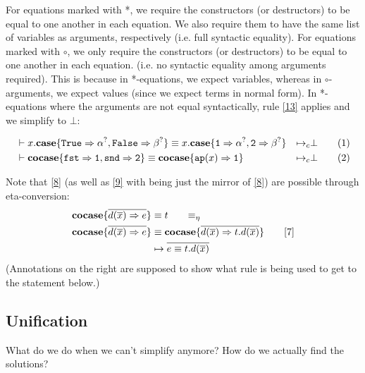 \documentclass[twoside,12pt,a4paper]{article}
\begin{document}
For equations marked with *, we require the constructors (or destructors) to be equal to one another in each equation. 
We also require them to have the same list of variables as arguments, respectively (i.e. full syntactic equality).
For equations marked with $\circ$, we only require the constructors (or destructors) to be equal to one another in each equation. 
(i.e. no syntactic equality among arguments required).
This is because in *-equations, we expect variables, whereas in $\circ$-arguments, we expect values (since we expect terms in normal form).
In *-equations where the arguments are not equal syntactically, rule \ref{13} applies and we simplify to $\bot$:

\begin{example}
    \begin{align}
        &\vdash x.\textbf{case}\{\mathtt{True\Rightarrow \alpha^?, False \Rightarrow \beta^?}\} 
        \equiv x.\textbf{case}\{\mathtt{1\Rightarrow \alpha^?, 2\Rightarrow\beta^?}\}
        &\mapsto_c& \bot \tag{1}\\
        &\vdash \textbf{cocase}\{\mathtt{fst\Rightarrow 1, snd\Rightarrow 2}\}
        \equiv \textbf{cocase}\{\texttt{ap}(x)\Rightarrow \mathtt{1}\}
        &\mapsto_c& \bot \tag{2}
    \end{align}
\end{example}



Note that \ref{8} (as well as \ref{9} with being just the mirror of \ref{8}) are possible through eta-conversion:
\begin{align*}
    \excopatmatch{\overline{d(\overline{x})\Rightarrow e}}&\equiv t \tag*{$\equiv_{\eta}$}\\
    \excopatmatch{\overline{d(\overline{x})\Rightarrow e}}&\equiv \excopatmatch{\overline{d(\overline{x})\Rightarrow t.d(\overline{x})}} \tag*{\ref{7}}\\
    &\mapsto \overline{e \equiv t.d(\overline{x})}
\end{align*}
(Annotations on the right are supposed to show what rule is being used to get to the statement below.)

\subsection{Unification}

What do we do when we can't simplify anymore? How do we actually find the solutions?
\end{document}
